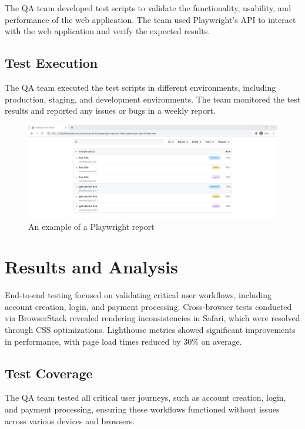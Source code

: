 The QA team developed test scripts to validate the functionality, usability, and performance of the web application. The team used Playwright's API to interact with the web application and verify the expected results.

\subsection{Test Execution}

The QA team executed the test scripts in different environments, including production, staging, and development environments. The team monitored the test results and reported any issues or bugs in a weekly report.

\begin{figure}[H]
    \centering
    \includegraphics[width=\textwidth]{project/images/playwright-reporting-playwrightreport.png}
    \caption{An example of a Playwright report}
    \label{fig:playwright-report}
\end{figure}

\section{Results and Analysis}

End-to-end testing focused on validating critical user workflows, including account creation, login, and payment processing. Cross-browser tests conducted via BrowserStack revealed rendering inconsistencies in Safari, which were resolved through CSS optimizations. Lighthouse metrics showed significant improvements in performance, with page load times reduced by 30\% on average.
\subsection{Test Coverage}

The QA team tested all critical user journeys, such as account creation, login, and payment processing, ensuring these workflows functioned without issues across various devices and browsers.

